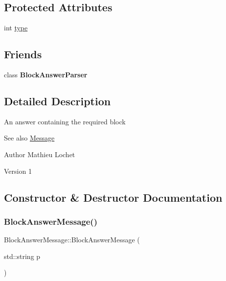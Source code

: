 \subsection*{Protected Attributes}
\begin{DoxyCompactItemize}
\item 
int \mbox{\hyperlink{classMessage_afbfb481c98b13d0deba0bac443bebe29}{type}}
\end{DoxyCompactItemize}
\subsection*{Friends}
\begin{DoxyCompactItemize}
\item 
\mbox{\label{classBlockAnswerMessage_aec03b63df2dcea2b43f28ba4ede77b27}} 
class {\bfseries Block\+Answer\+Parser}
\end{DoxyCompactItemize}


\subsection{Detailed Description}
An answer containing the required block \begin{DoxySeeAlso}{See also}
\mbox{\hyperlink{classMessage}{Message}}
\end{DoxySeeAlso}
\begin{DoxyAuthor}{Author}
Mathieu Lochet 
\end{DoxyAuthor}
\begin{DoxyVersion}{Version}
1 
\end{DoxyVersion}


\subsection{Constructor \& Destructor Documentation}
\mbox{\label{classBlockAnswerMessage_a7d562144e7ad2ff1c5ab8fdbc3d27d32}} 
\subsubsection{\texorpdfstring{Block\+Answer\+Message()}{BlockAnswerMessage()}}
{\footnotesize\ttfamily Block\+Answer\+Message\+::\+Block\+Answer\+Message (\begin{DoxyParamCaption}\item[{std\+::string}]{p }\end{DoxyParamCaption})}

